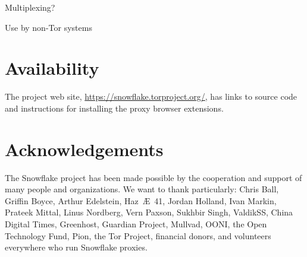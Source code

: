 \documentclass[letterpaper,twocolumn]{article}
\begin{document}
Multiplexing?

Use by non-Tor systems

\section*{Availability}

The project web site,
\url{https://snowflake.torproject.org/},
has links to source code
and instructions for installing the proxy browser extensions.

\section*{Acknowledgements}

The Snowflake project has been made possible
by the cooperation and support of many people
and organizations.
We want to thank particularly:
Chris Ball, %
Griffin Boyce, %
Arthur Edelstein, %
Haz~Æ~41, %
Jordan Holland, %
Ivan Markin, %
Prateek Mittal, %
Linus Nordberg, %
Vern Paxson, %
Sukhbir Singh, %
ValdikSS, %
China Digital Times,
Greenhost, %
Guardian Project, %
Mullvad, %
OONI, %
the Open Technology Fund, %
Pion,
the Tor Project,
financial donors,
and volunteers everywhere who run Snowflake proxies.



\end{document}
